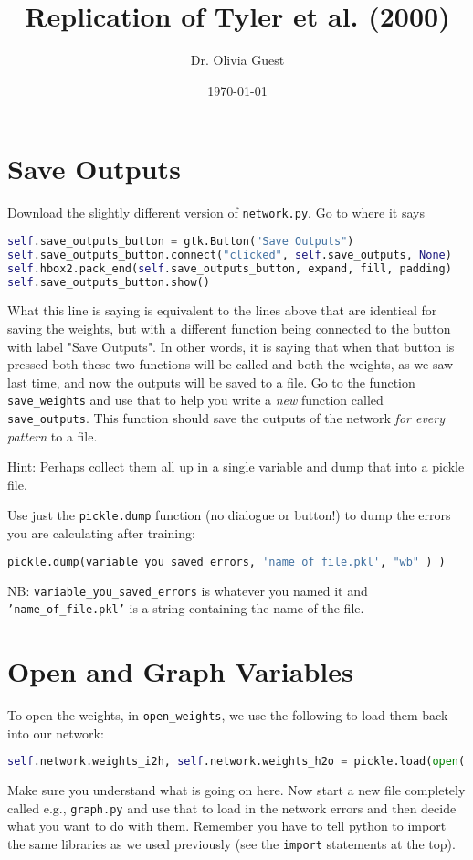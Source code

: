 \documentclass[a4paper,10pt]{article}
\title{Replication of Tyler et al. (2000)}
\author{Dr. Olivia Guest}
\date{\today}
\begin{document}
\maketitle

\section{Save Outputs}
Download the slightly different version of \texttt{network.py}. Go to where it says
\begin{lstlisting}[language=Python]
self.save_outputs_button = gtk.Button("Save Outputs")
self.save_outputs_button.connect("clicked", self.save_outputs, None)
self.hbox2.pack_end(self.save_outputs_button, expand, fill, padding)
self.save_outputs_button.show()
\end{lstlisting}

What this line is saying is equivalent to the lines above that are identical for saving the weights, but with a different function being connected to the button with label "Save Outputs". In other words, it is saying that when that button is pressed both these two functions will be called and both the weights, as we saw last time, and now the outputs will be saved to a file. Go to the function \texttt{save\_weights} and use that to help you write a \emph{new} function called \texttt{save\_outputs}. This function should save the outputs of the network \emph{for every pattern} to a file.

Hint: Perhaps collect them all up in a single variable and dump that into a pickle file.

Use just the \texttt{pickle.dump} function (no dialogue or button!) to dump the errors you are calculating after training:
\begin{lstlisting}[language=Python]
pickle.dump(variable_you_saved_errors, 'name_of_file.pkl', "wb" ) )
\end{lstlisting}
NB: \texttt{variable\_you\_saved\_errors} is whatever you named it and \texttt{'name\_of\_file.pkl'} is a string containing the name of the file.

\section{Open and Graph Variables}
To open the weights, in \texttt{open\_weights}, we use the following to load them back into our network:
\begin{lstlisting}[language=Python]
self.network.weights_i2h, self.network.weights_h2o = pickle.load(open( dialog.get_filename(), "rb" ) )
\end{lstlisting}
Make sure you understand what is going on here. Now start a new file completely called e.g., \texttt{graph.py} and use that to load in the network errors and then decide what you want to do with them. Remember you have to tell python to import the same libraries as we used previously (see the \texttt{import} statements at the top). 
\end{document}
